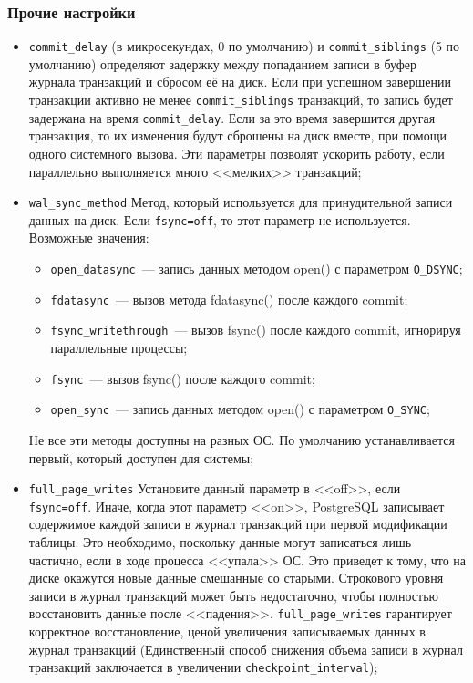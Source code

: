 \subsubsection{Прочие настройки}


\begin{itemize}
  \item \lstinline!commit_delay! (в микросекундах, 0 по умолчанию) и \lstinline!commit_siblings! (5 по умолчанию) определяют задержку между попаданием записи в буфер журнала транзакций и сбросом её на диск. Если при успешном завершении транзакции активно не менее \lstinline!commit_siblings! транзакций, то запись будет задержана на время \lstinline!commit_delay!. Если за это время завершится другая транзакция, то их изменения будут сброшены на диск вместе, при помощи одного системного вызова. Эти параметры позволят ускорить работу, если параллельно выполняется много <<мелких>> транзакций;

  \item \lstinline!wal_sync_method! Метод, который используется для принудительной записи данных на диск. Если \lstinline!fsync=off!, то этот параметр не используется. Возможные значения:
  \begin{itemize}
    \item \lstinline!open_datasync!~--- запись данных методом open() с параметром \lstinline!O_DSYNC!;
    \item \lstinline!fdatasync!~--- вызов метода fdatasync() после каждого commit;
    \item \lstinline!fsync_writethrough!~--- вызов fsync() после каждого commit, игнорируя параллельные процессы;
    \item \lstinline!fsync!~--- вызов fsync() после каждого commit;
    \item \lstinline!open_sync!~--- запись данных методом open() с параметром \lstinline!O_SYNC!;
  \end{itemize}

  Не все эти методы доступны на разных ОС. По умолчанию устанавливается первый, который доступен для системы;

  \item \lstinline!full_page_writes! Установите данный параметр в <<off>>, если \lstinline!fsync=off!. Иначе, когда этот параметр <<on>>, PostgreSQL записывает содержимое каждой записи в журнал транзакций при первой модификации таблицы. Это необходимо, поскольку данные могут записаться лишь частично, если в ходе процесса <<упала>> ОС. Это приведет к тому, что на диске окажутся новые данные смешанные со старыми. Строкового уровня записи в журнал транзакций может быть недостаточно, чтобы полностью восстановить данные после <<падения>>. \lstinline!full_page_writes! гарантирует корректное восстановление, ценой увеличения записываемых данных в журнал транзакций (Единственный способ снижения объема записи в журнал транзакций заключается в увеличении \lstinline!checkpoint_interval!);


\end{itemize}
